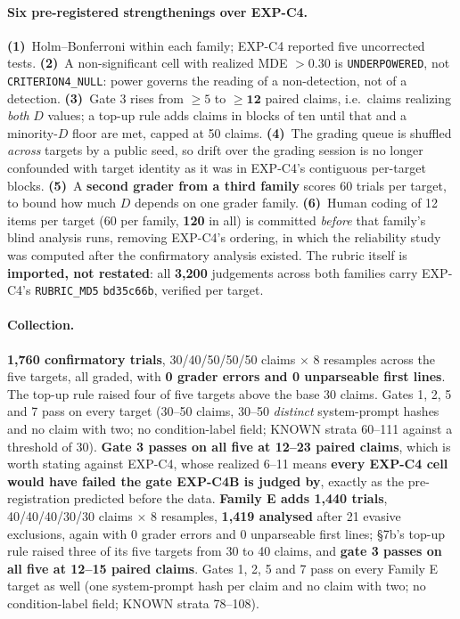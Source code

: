 \paragraph{Six pre-registered strengthenings over EXP-C4.} \textbf{(1)}~Holm--Bonferroni within each family; EXP-C4 reported five uncorrected tests. \textbf{(2)}~A non-significant cell with realized MDE $>0.30$ is \texttt{UNDERPOWERED}, not \texttt{CRITERION4\_NULL}: power governs the reading of a non-detection, not of a detection. \textbf{(3)}~Gate 3 rises from $\ge\!5$ to $\ge\!\mathbf{12}$ paired claims, i.e.\ claims realizing \emph{both} $D$ values; a top-up rule adds claims in blocks of ten until that and a minority-$D$ floor are met, capped at 50 claims. \textbf{(4)}~The grading queue is shuffled \emph{across} targets by a public seed, so drift over the grading session is no longer confounded with target identity as it was in EXP-C4's contiguous per-target blocks. \textbf{(5)}~A \textbf{second grader from a third family} scores 60 trials per target, to bound how much $D$ depends on one grader family. \textbf{(6)}~Human coding of 12 items per target (60 per family, \textbf{120} in all) is committed \emph{before} that family's blind analysis runs, removing EXP-C4's ordering, in which the reliability study was computed after the confirmatory analysis existed. The rubric itself is \textbf{imported, not restated}: all \textbf{3{,}200} judgements across both families carry EXP-C4's \texttt{RUBRIC\_MD5} \texttt{bd35c66b}, verified per target.

\paragraph{Collection.} \textbf{1{,}760 confirmatory trials}, 30/40/50/50/50 claims $\times$ 8 resamples across the five targets, all graded, with \textbf{0 grader errors and 0 unparseable first lines}. The top-up rule raised four of five targets above the base 30 claims. Gates 1, 2, 5 and 7 pass on every target (30--50 claims, 30--50 \emph{distinct} system-prompt hashes and no claim with two; no condition-label field; KNOWN strata 60--111 against a threshold of 30). \textbf{Gate 3 passes on all five at 12--23 paired claims}, which is worth stating against EXP-C4, whose realized 6--11 means \textbf{every EXP-C4 cell would have failed the gate EXP-C4B is judged by}, exactly as the pre-registration predicted before the data. \textbf{Family E adds 1{,}440 trials}, 40/40/40/30/30 claims $\times$ 8 resamples, \textbf{1{,}419 analysed} after 21 evasive exclusions, again with 0 grader errors and 0 unparseable first lines; §7b's top-up rule raised three of its five targets from 30 to 40 claims, and \textbf{gate 3 passes on all five at 12--15 paired claims}. Gates 1, 2, 5 and 7 pass on every Family E target as well (one system-prompt hash per claim and no claim with two; no condition-label field; KNOWN strata 78--108).

